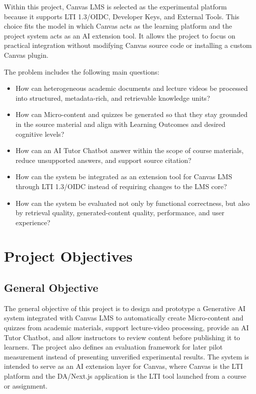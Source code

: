 Within this project, Canvas LMS is selected as the experimental platform because
it supports LTI 1.3/OIDC, Developer Keys, and External Tools. This choice fits
the model in which Canvas acts as the learning platform and the project system
acts as an AI extension tool. It allows the project to focus on practical
integration without modifying Canvas source code or installing a custom Canvas
plugin.

The problem includes the following main questions:
\begin{itemize}
    \item How can heterogeneous academic documents and lecture videos be
          processed into structured, metadata-rich, and retrievable knowledge
          units?
    \item How can Micro-content and quizzes be generated so that they stay
          grounded in the source material and align with Learning Outcomes and
          desired cognitive levels?
    \item How can an AI Tutor Chatbot answer within the scope of course
          materials, reduce unsupported answers, and support source citation?
    \item How can the system be integrated as an extension tool for Canvas LMS
          through LTI 1.3/OIDC instead of requiring changes to the LMS core?
    \item How can the system be evaluated not only by functional correctness,
          but also by retrieval quality, generated-content quality,
          performance, and user experience?
\end{itemize}

\section{Project Objectives}

\subsection{General Objective}

The general objective of this project is to design and prototype a Generative
AI system integrated with Canvas LMS to automatically create Micro-content and
quizzes from academic materials, support lecture-video processing, provide an
AI Tutor Chatbot, and allow instructors to review content before publishing it
to learners. The project also defines an evaluation framework for later pilot
measurement instead of presenting unverified experimental results. The system
is intended to serve as an AI extension layer for Canvas, where Canvas is the
LTI platform and the DA/Next.js application is the LTI tool launched from a
course or assignment.

